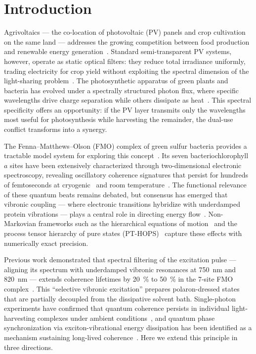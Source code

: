 \documentclass[twocolumn]{article}
\begin{document}
\section*{Introduction}

Agrivoltaics --- the co-location of photovoltaic (PV) panels and crop cultivation on the same land --- addresses the growing competition between food production and renewable energy generation~\cite{Goetzberger1981,Dupraz2011}.
Standard semi-transparent PV systems, however, operate as static optical filters: they reduce total irradiance uniformly, trading electricity for crop yield without exploiting the spectral dimension of the light-sharing problem~\cite{Thompson2020,Alshareef2024}.
The photosynthetic apparatus of green plants and bacteria has evolved under a spectrally structured photon flux, where specific wavelengths drive charge separation while others dissipate as heat~\cite{Blankenship2011}.
This spectral specificity offers an opportunity: if the PV layer transmits only the wavelengths most useful for photosynthesis while harvesting the remainder, the dual-use conflict transforms into a synergy.

The Fenna--Matthews--Olson (FMO) complex of green sulfur bacteria provides a tractable model system for exploring this concept~\cite{Fenna1975}.
Its seven bacteriochlorophyll $a$ sites have been extensively characterized through two-dimensional electronic spectroscopy, revealing oscillatory coherence signatures that persist for hundreds of femtoseconds at cryogenic~\cite{Engel2007} and room temperature~\cite{Panitchayangkoon2010}.
The functional relevance of these quantum beats remains debated, but consensus has emerged that vibronic coupling --- where electronic transitions hybridize with underdamped protein vibrations --- plays a central role in directing energy flow~\cite{Chin2013,Christensson2012}.
Non-Markovian frameworks such as the hierarchical equations of motion~\cite{Tanimura1989} and the process tensor hierarchy of pure states (PT-HOPS)~\cite{Varvelo2021,Citty2024} capture these effects with numerically exact precision.

Previous work demonstrated that spectral filtering of the excitation pulse --- aligning its spectrum with underdamped vibronic resonances at \SI{750}{\nm} and \SI{820}{\nm} --- extends coherence lifetimes by \SI{20}{\percent} to \SI{50}{\percent} in the 7-site FMO complex~\cite{Kouam2026}.
This ``selective vibronic excitation'' prepares polaron-dressed states that are partially decoupled from the dissipative solvent bath.
Single-photon experiments have confirmed that quantum coherence persists in individual light-harvesting complexes under ambient conditions~\cite{Li2023}, and quantum phase synchronization via exciton-vibrational energy dissipation has been identified as a mechanism sustaining long-lived coherence~\cite{Zhu2024}.
Here we extend this principle in three directions.
\end{document}
